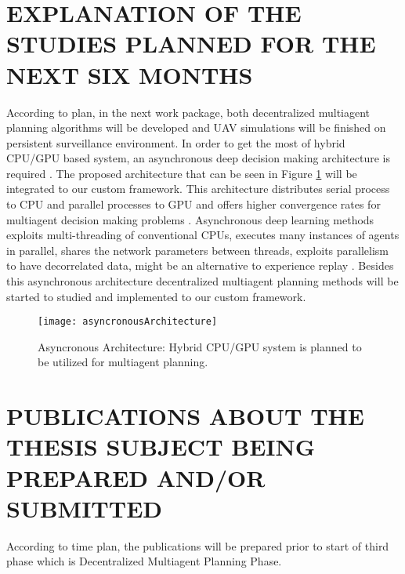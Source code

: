 \documentclass{ituphdreport}
\begin{document}
\section{EXPLANATION OF THE STUDIES PLANNED FOR THE NEXT SIX MONTHS}
According to plan, in the next work package, both decentralized multiagent planning algorithms will be developed and UAV simulations will be finished on persistent surveillance environment. In order to get the most of hybrid CPU/GPU based system, an asynchronous deep decision making architecture is required \cite{stooke2018accelerated}. The proposed architecture that can be seen in Figure \ref{fig:asyncronousArchitecture} will be integrated to our custom framework. This architecture distributes serial process to CPU and parallel processes to GPU and offers higher convergence rates for multiagent decision making problems \cite{babaeizadeh2016reinforcement}. Asynchronous deep learning methods exploits multi-threading of conventional CPUs, executes many instances of agents in parallel, shares the network parameters between threads, exploits parallelism to have decorrelated data, might be an alternative to experience replay \cite{gasicdrl}.  Besides this asynchronous architecture decentralized multiagent planning methods will be started to studied and implemented to our custom framework.

\begin{figure}[H]
	\begin{center}
		\texttt{[image: asyncronousArchitecture]}
	\end{center}
	\caption{Asyncronous Architecture: Hybrid CPU/GPU system is planned to be utilized for multiagent planning.
		\label{fig:asyncronousArchitecture}}
\end{figure}

\section{PUBLICATIONS ABOUT THE THESIS SUBJECT BEING PREPARED AND/OR SUBMITTED}
According to time plan, the publications will be prepared prior to start of third phase which is Decentralized Multiagent Planning Phase.



\end{document}
